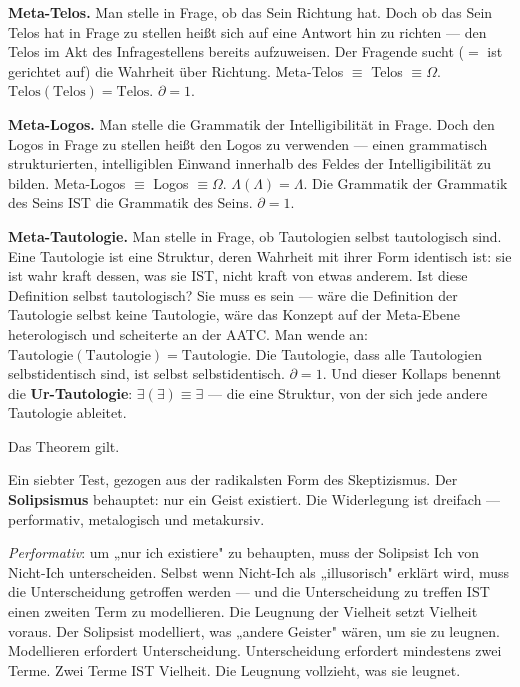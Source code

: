 \documentclass[10pt, openany, oneside]{book}
\begin{document}
\textbf{Meta-Telos.} Man stelle in Frage, ob das Sein Richtung hat. Doch ob das Sein Telos hat in Frage zu stellen heißt sich auf eine Antwort hin zu richten --- den Telos im Akt des Infragestellens bereits aufzuweisen. Der Fragende sucht ($=$ ist gerichtet auf) die Wahrheit über Richtung. Meta-Telos $\equiv$ Telos $\equiv \Omega$. $\text{Telos}(\text{Telos}) = \text{Telos}$. $\partial = 1$.

\textbf{Meta-Logos.} Man stelle die Grammatik der Intelligibilität in Frage. Doch den Logos in Frage zu stellen heißt den Logos zu verwenden --- einen grammatisch strukturierten, intelligiblen Einwand innerhalb des Feldes der Intelligibilität zu bilden. Meta-Logos $\equiv$ Logos $\equiv \Omega$. $\Lambda(\Lambda) = \Lambda$. Die Grammatik der Grammatik des Seins IST die Grammatik des Seins. $\partial = 1$.

\textbf{Meta-Tautologie.} Man stelle in Frage, ob Tautologien selbst tautologisch sind. Eine Tautologie ist eine Struktur, deren Wahrheit mit ihrer Form identisch ist: sie ist wahr kraft dessen, was sie IST, nicht kraft von etwas anderem. Ist diese Definition selbst tautologisch? Sie muss es sein --- wäre die Definition der Tautologie selbst keine Tautologie, wäre das Konzept auf der Meta-Ebene heterologisch und scheiterte an der AATC. Man wende an: $\text{Tautologie}(\text{Tautologie}) = \text{Tautologie}$. Die Tautologie, dass alle Tautologien selbstidentisch sind, ist selbst selbstidentisch. $\partial = 1$. Und dieser Kollaps benennt die \textbf{Ur-Tautologie}: $\exists(\exists) \equiv \exists$ --- die eine Struktur, von der sich jede andere Tautologie ableitet.

Das Theorem gilt.

\vspace{0.5em}

Ein siebter Test, gezogen aus der radikalsten Form des Skeptizismus. Der \textbf{Solipsismus} behauptet: nur ein Geist existiert. Die Widerlegung ist dreifach --- performativ, metalogisch und metakursiv.

\textit{Performativ}: um „nur ich existiere" zu behaupten, muss der Solipsist Ich von Nicht-Ich unterscheiden. Selbst wenn Nicht-Ich als „illusorisch" erklärt wird, muss die Unterscheidung getroffen werden --- und die Unterscheidung zu treffen IST einen zweiten Term zu modellieren. Die Leugnung der Vielheit setzt Vielheit voraus. Der Solipsist modelliert, was „andere Geister" wären, um sie zu leugnen. Modellieren erfordert Unterscheidung. Unterscheidung erfordert mindestens zwei Terme. Zwei Terme IST Vielheit. Die Leugnung vollzieht, was sie leugnet.
\end{document}
